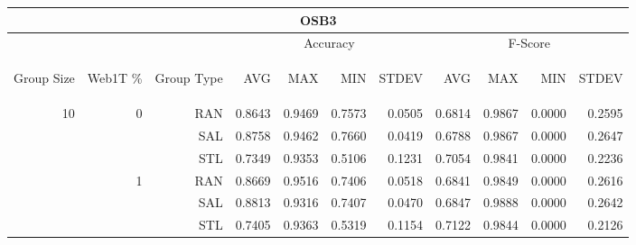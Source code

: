 \begin{center}
\begin{table}[htbp] 
 \begin{center}
\begin{tabular}{ | r | r | r | r | r | r | r | r | r | r | r |}
\hline
\multicolumn{11}{|c|}{OSB3}\\
\hline
 & & & \multicolumn{4}{|c|}{Accuracy} & \multicolumn{4}{|c|}{F-Score}\\ \cline{4-11}
\begin{sideways}Group Size\end{sideways} & \begin{sideways}Web1T \%\end{sideways} & \begin{sideways}Group Type\end{sideways} & \begin{sideways}AVG\end{sideways} & \begin{sideways}MAX\end{sideways} & \begin{sideways}MIN\end{sideways} & \begin{sideways}STDEV\end{sideways} & \begin{sideways}AVG\end{sideways} & \begin{sideways}MAX\end{sideways} & \begin{sideways}MIN\end{sideways} & \begin{sideways}STDEV\end{sideways}\\
\hline
\multirow{15}{*}{10}
 & \multirow{3}{*}{0} & RAN & 0.8643 & 0.9469 & 0.7573 & 0.0505 & 0.6814 & 0.9867 & 0.0000 & 0.2595\\ \cline{3-11}
 &   & SAL & 0.8758 & 0.9462 & 0.7660 & 0.0419 & 0.6788 & 0.9867 & 0.0000 & 0.2647\\ \cline{3-11}
 &   & STL & 0.7349 & 0.9353 & 0.5106 & 0.1231 & 0.7054 & 0.9841 & 0.0000 & 0.2236\\ \cline{2-11}
 & \multirow{3}{*}{1} & RAN & 0.8669 & 0.9516 & 0.7406 & 0.0518 & 0.6841 & 0.9849 & 0.0000 & 0.2616\\ \cline{3-11}
 &   & SAL & 0.8813 & 0.9316 & 0.7407 & 0.0470 & 0.6847 & 0.9888 & 0.0000 & 0.2642\\ \cline{3-11}
 &   & STL & 0.7405 & 0.9363 & 0.5319 & 0.1154 & 0.7122 & 0.9844 & 0.0000 & 0.2126\\ \cline{2-11}

\end{tabular}
\end{center}
\end{table}
\end{center}
